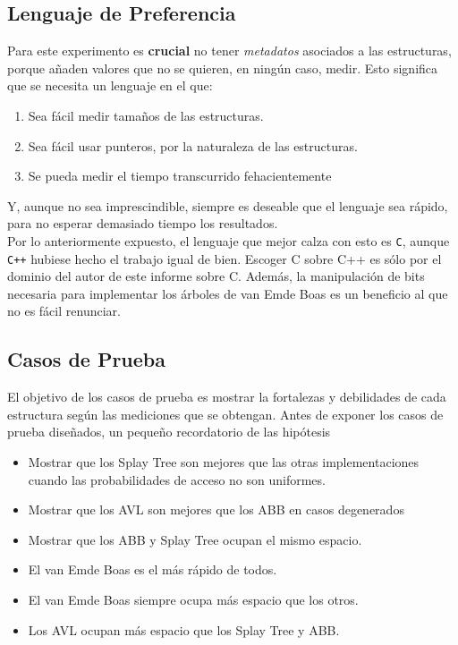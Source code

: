 \documentclass[12pt,letterpaper]{report}
\begin{document}
\subsection{Lenguaje de Preferencia}
\label{subsec:lenguaje}
Para este experimento es \textbf{crucial} no tener \emph{metadatos} asociados a las estructuras, porque añaden valores que no se quieren, en ningún caso, medir. Esto significa que se necesita un lenguaje en el que:
\begin{enumerate}
\item Sea fácil medir tamaños de las estructuras.
\item Sea fácil usar punteros, por la naturaleza de las estructuras.
\item Se pueda medir el tiempo transcurrido fehacientemente
\end{enumerate}

Y, aunque no sea imprescindible, siempre es deseable que el lenguaje sea rápido, para no esperar demasiado tiempo los resultados.\\

Por lo anteriormente expuesto, el lenguaje que mejor calza con esto es \texttt{C}, aunque \texttt{C++} hubiese hecho el trabajo igual de bien. Escoger C sobre C++ es sólo por el dominio del autor de este informe sobre C. Además, la manipulación de bits necesaria para implementar los árboles de van Emde Boas es un beneficio al que no es fácil renunciar.


\subsection{Casos de Prueba}
\label{subsec:casos_prueba}
El objetivo de los casos de prueba es mostrar la fortalezas y debilidades de cada estructura según las mediciones que se obtengan. Antes de exponer los casos de prueba diseñados, un pequeño recordatorio de las hipótesis

\begin{itemize}
\item Mostrar que los Splay Tree son mejores que las otras implementaciones cuando las probabilidades de acceso no son uniformes.
\item Mostrar que los AVL son mejores que los ABB en casos degenerados
\item Mostrar que los ABB y Splay Tree ocupan el mismo espacio.
\item El van Emde Boas es el más rápido de todos.
\item El van Emde Boas siempre ocupa más espacio que los otros.
\item Los AVL ocupan más espacio que los Splay Tree y ABB.
\end{itemize}
\end{document}
